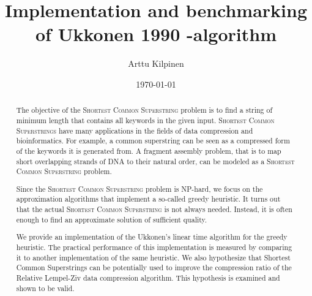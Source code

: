 \documentclass[english,twoside,censored,csm,algorithms-track-2020]{HYthesisML}
\title{Implementation and benchmarking of Ukkonen 1990 -algorithm}
\author{Arttu Kilpinen}
\date{\today}
\theoremstyle{plain}
\theoremstyle{definition}
\begin{document}
\maketitle



\begin{abstract}

  The objective of the \textsc{Shortest Common Superstring} problem is to find a string of
  minimum length that contains all keywords in the given input.
  \textsc{Shortest Common Superstrings} have many applications in the fields of
  data compression and bioinformatics. For example, a common superstring can be seen as a
  compressed form of the keywords it is generated from. A fragment assembly problem,
  that is to map short overlapping strands of DNA to their natural order, can be modeled
  as a \textsc{Shortest Common Superstring} problem.
  
  Since the \textsc{Shortest Common Superstring} problem is \textsc{NP}-hard,
  we focus on the approximation algorithms that implement a so-called greedy
  heuristic. It turns out that the actual \textsc{Shortest Common Superstring}
  is not always needed. Instead, it is often enough to find an
  approximate solution of sufficient quality. 

  We provide an implementation of the Ukkonen's linear time algorithm for the
  greedy heuristic. The practical performance of this implementation is measured by
  comparing it to another implementation of the same heuristic.
  We also hypothesize that Shortest Common Superstrings can be potentially used
  to improve the compression ratio of the Relative Lempel-Ziv data compression algorithm.
  This hypothesis is examined and shown to be valid.
  
\end{abstract}

\newpage
\mytableofcontents
\mainmatter

\end{document}
